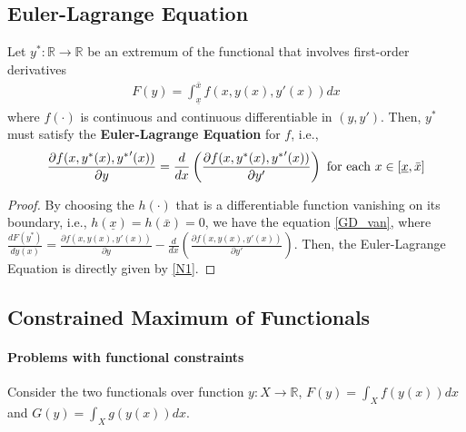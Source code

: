 \documentclass[11pt]{elegantbook}
\begin{document}
\subsection{Euler-Lagrange Equation}
\begin{proposition}
    Let $y^*: \mathbb{R} \rightarrow \mathbb{R}$ be an extremum of the functional that involves first-order derivatives
    \begin{equation}
        \begin{aligned}
            F(y)=\int_{\underline{x}}^{\bar{x}} f(x,y(x),y'(x))dx
        \end{aligned}
        \nonumber
    \end{equation}
    where $f(\cdot)$ is continuous and continuous differentiable in $(y,y')$. Then, $y^*$ must satisfy the \textbf{Euler-Lagrange Equation} for $f$, i.e.,
    \begin{equation}
        \begin{aligned}
            \frac{\partial f(x,y^*(x),{y^*}'(x))}{\partial y}=\frac{d}{dx}\left(\frac{\partial f(x,y^*(x),{y^*}'(x))}{\partial y'}\right) \textnormal{ for each }x\in [\underline{x},\bar{x}]
        \end{aligned}
        \nonumber
    \end{equation}
\end{proposition}
\begin{proof}
    By choosing the $h(\cdot)$ that is a differentiable function vanishing on its boundary, i.e., $h(\underline{x})=h(\bar{x})=0$, we have the equation \eqref{GD_van}, where $\frac{d F(y^*)}{d y(x)}=\frac{\partial f(x,y(x),y'(x))}{\partial y}-\frac{d}{dx}\left(\frac{\partial f(x,y(x),y'(x))}{\partial y'}\right)$. Then, the Euler-Lagrange Equation is directly given by \eqref{N1}.
\end{proof}


\subsection{Constrained Maximum of Functionals}
\paragraph*{Problems with functional constraints}
Consider the two functionals over function $y: X \rightarrow \mathbb{R}$, $F(y)=\int_X f(y(x))dx$ and $G(y)=\int_X g(y(x))dx$.
\end{document}
